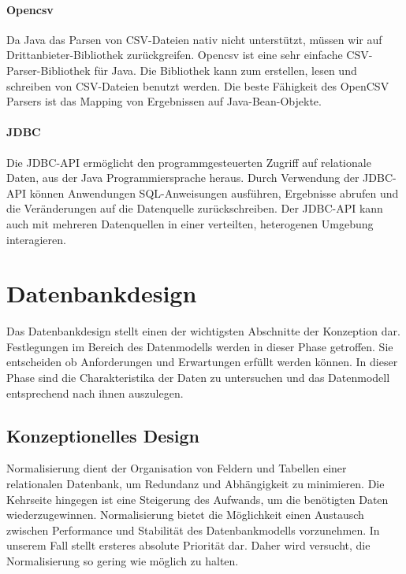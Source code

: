 \paragraph{Opencsv}

Da Java das Parsen von CSV-Dateien nativ nicht unterstützt, müssen wir auf Drittanbieter-Bibliothek zurückgreifen. Opencsv ist eine sehr einfache CSV-Parser-Bibliothek für Java. Die Bibliothek kann zum erstellen, lesen und schreiben von CSV-Dateien benutzt werden. Die beste Fähigkeit des OpenCSV Parsers ist das Mapping von Ergebnissen auf Java-Bean-Objekte.

\paragraph{JDBC}

Die JDBC-API ermöglicht den programmgesteuerten Zugriff auf relationale Daten, aus der Java Programmiersprache heraus. Durch Verwendung der JDBC-API können Anwendungen SQL-Anweisungen ausführen, Ergebnisse abrufen und die Veränderungen auf die Datenquelle zurückschreiben. Der JDBC-API kann auch mit mehreren Datenquellen in einer verteilten, heterogenen Umgebung interagieren. 

\section{Datenbankdesign}

Das Datenbankdesign stellt einen der wichtigsten Abschnitte der Konzeption dar. Festlegungen im Bereich des Datenmodells werden in dieser Phase getroffen. Sie entscheiden ob Anforderungen und Erwartungen erfüllt werden können. In dieser Phase sind die Charakteristika der Daten zu untersuchen und das Datenmodell entsprechend nach ihnen auszulegen.

\subsection{Konzeptionelles Design}

Normalisierung dient der Organisation von Feldern und Tabellen einer relationalen Datenbank, um Redundanz und Abhängigkeit zu minimieren. Die Kehrseite hingegen ist eine Steigerung des Aufwands, um die benötigten Daten wiederzugewinnen. Normalisierung bietet die Möglichkeit einen Austausch zwischen Performance und Stabilität des Datenbankmodells vorzunehmen. 
In unserem Fall stellt ersteres absolute Priorität dar. Daher wird versucht, die Normalisierung so gering wie möglich zu halten. 


